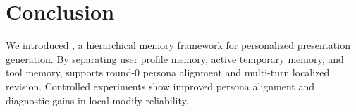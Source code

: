 \section{Conclusion}

We introduced \methodname, a hierarchical memory framework for personalized
presentation generation. By separating user profile memory, active temporary
memory, and tool memory, \methodname supports round-0 persona alignment and
multi-turn localized revision. Controlled experiments show improved persona
alignment and diagnostic gains in local modify reliability.
